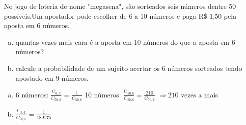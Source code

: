 \begin{ex}
 No jogo de loteria de nome "megasena", são sorteados seis números dentre 50 possíveis.Um apostador pode escolher de 6 a 10 números e paga  R\$ 1,50   pela aposta em 6 números.
    \begin{enumerate}[(a)]
    \item quantas vezes mais cara é a aposta em 10 números do que a aposta em 6 números?
    \item calcule a probabilidade de um sujeito acertar os 6 números sorteados tendo apostado  em 9 números.
    \end{enumerate}
      \begin{sol}
          \phantom{A} 
        \begin{enumerate} [(a)]
            \item 6 números: $ \frac{\mathrm{C}_{6,6}}{{C}_{{50},6}}=\frac{1}{\mathrm{C}_{{50},6}}$\hspace{0.4cm}
            10 números: $\frac{\mathrm{C}_{{10},6}}{{C}_{{50},6}}=\frac{210}{\mathrm{C}_{{50},6}}$\hspace{0.3cm} $\Longrightarrow 210$ vezes a mais
            \item $\frac{\mathrm{C}_{9,6}}{{C}_{{50},6}} = \frac{1}{189175}$
            
        \end{enumerate}
      \end{sol}
\end{ex}